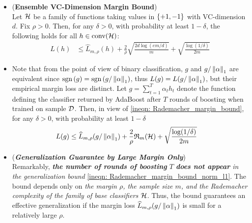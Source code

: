 \documentclass[11pt]{article}
\begin{document}
\begin{itemize}
\item \begin{theorem} (\textbf{Ensemble VC-Dimension Margin Bound}) \citep{schapire2012boosting, mohri2018foundations} \\
Let ${\mathcal H}$ be a family of functions taking values in $\left\{+1, -1\right\}$ with VC-dimension $d$. Fix $\rho > 0$. Then, for any $\delta > 0$, with probability at least $1 - \delta$,  the following holds for all $h \in \text{conv}({\mathcal H})$:
\begin{align}
L(h) &\le \widehat{L}_{m, \rho}(h) + \frac{2}{\rho}\sqrt{\frac{2d \log(em/d)}{m}}   + \sqrt{\frac{\log(1 / \delta)}{2m}} \label{eqn: Rademacher_margin_bound_vc_dim}
\end{align}
\end{theorem}

\item \begin{remark}
Note that from the point of view of binary classification, $g$ and $g/\left\|\alpha\right\|_{1}$ are equivalent since $\text{sgn}\left(g\right) = \text{sgn}\left(g/\left\|\alpha\right\|_{1}\right)$, thus $L(g) = L(g/\left\|\alpha\right\|_{1})$, but their empirical margin loss are distinct. Let $g =\sum^T_{t=1}\alpha_t h_t$ denote the function defining the classifier returned by AdaBoost after $T$ rounds of boosting when trained on sample ${\mathcal D}$. Then, in view of \eqref{ineqn: Rademacher_margin_bound},  for any $\delta > 0$, with
probability at least $1 - \delta$
\begin{align}
L(g) &\le \widehat{L}_{m, \rho}(g/\left\|\alpha\right\|_{1}) + \frac{2}{\rho} {\mathfrak R}_{m}({\mathcal H})  + \sqrt{\frac{\log(1 / \delta)}{2m}}  \label{ineqn: Rademacher_margin_bound_norm_l1}
\end{align}
\end{remark}

\item \begin{remark}(\textbf{\emph{Generalization Guarantee by Large Margin Only}})\\
Remarkably, \emph{\textbf{the number of rounds of boosting} $T$ \textbf{does not appear} in the generalization bound} \eqref{ineqn: Rademacher_margin_bound_norm_l1}. The bound depends only on \emph{the margin $\rho$, the sample size $m$, and the Rademacher complexity of the family of base classifiers ${\mathcal H}$}. Thus, the bound guarantees an effective generalization if the margin loss $\widehat{L}_{m, \rho}(g/\left\|\alpha\right\|_{1})$ is small for a relatively large
$\rho$. 
\end{remark}



\end{itemize}
\end{document}
